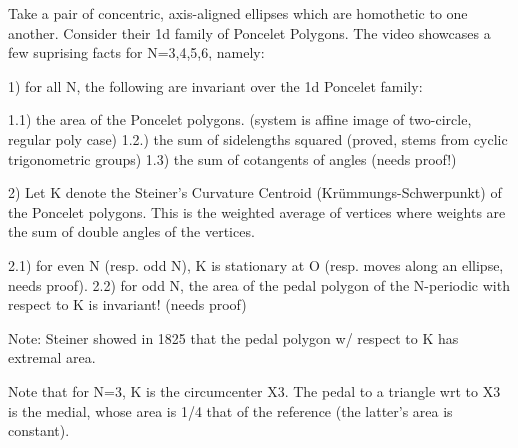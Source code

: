 Take a pair of concentric, axis-aligned ellipses which are homothetic to one another. Consider their 1d family of Poncelet Polygons. The video showcases a few suprising facts for N=3,4,5,6, namely:

1) for all N, the following are invariant over the 1d Poncelet family:

1.1) the area of the Poncelet polygons. (system is affine image of two-circle, regular poly case)
1.2.) the sum of sidelengths squared (proved, stems from cyclic trigonometric groups)
1.3) the sum of cotangents of angles (needs proof!)

2) Let K denote the Steiner's Curvature Centroid (Krümmungs-Schwerpunkt) of the Poncelet polygons. This is the weighted average of vertices where weights are the sum of double angles of the vertices.

2.1) for even N (resp. odd N), K is stationary at O (resp. moves along an ellipse, needs proof).
2.2) for odd N, the area of the pedal polygon of the N-periodic with respect to K is invariant! (needs proof)

Note: Steiner showed in 1825 that the pedal polygon w/ respect to K has extremal area.

Note that for N=3, K is the circumcenter X3. The pedal to a triangle wrt to X3 is the medial, whose area is 1/4 that of the reference (the latter's area is constant).